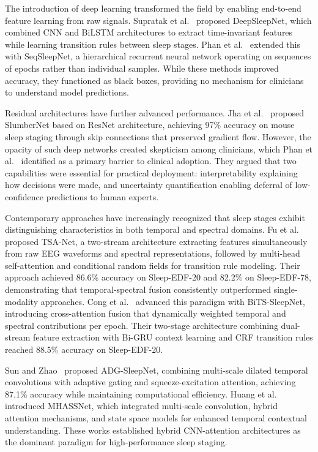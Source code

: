 \documentclass{ieeetj}
\begin{document}
The introduction of deep learning transformed the field by enabling end-to-end feature learning from raw signals. Supratak et al.~\cite{supratak2017deepsleepnet} proposed DeepSleepNet, which combined CNN and BiLSTM architectures to extract time-invariant features while learning transition rules between sleep stages. Phan et al.~\cite{phan2018deepsleepnet} extended this with SeqSleepNet, a hierarchical recurrent neural network operating on sequences of epochs rather than individual samples. While these methods improved accuracy, they functioned as black boxes, providing no mechanism for clinicians to understand model predictions.

Residual architectures have further advanced performance. Jha et al.~\cite{jha2024slumbernet} proposed SlumberNet based on ResNet architecture, achieving 97\% accuracy on mouse sleep staging through skip connections that preserved gradient flow. However, the opacity of such deep networks created skepticism among clinicians, which Phan et al.~\cite{phan2022sleeptransformer} identified as a primary barrier to clinical adoption. They argued that two capabilities were essential for practical deployment: interpretability explaining how decisions were made, and uncertainty quantification enabling deferral of low-confidence predictions to human experts.

Contemporary approaches have increasingly recognized that sleep stages exhibit distinguishing characteristics in both temporal and spectral domains. Fu et al.~\cite{fu2023tsanet} proposed TSA-Net, a two-stream architecture extracting features simultaneously from raw EEG waveforms and spectral representations, followed by multi-head self-attention and conditional random fields for transition rule modeling. Their approach achieved 86.6\% accuracy on Sleep-EDF-20 and 82.2\% on Sleep-EDF-78, demonstrating that temporal-spectral fusion consistently outperformed single-modality approaches. Cong et al.~\cite{cong2025bits} advanced this paradigm with BiTS-SleepNet, introducing cross-attention fusion that dynamically weighted temporal and spectral contributions per epoch. Their two-stage architecture combining dual-stream feature extraction with Bi-GRU context learning and CRF transition rules reached 88.5\% accuracy on Sleep-EDF-20.

Sun and Zhao~\cite{sun2025adg} proposed ADG-SleepNet, combining multi-scale dilated temporal convolutions with adaptive gating and squeeze-excitation attention, achieving 87.1\% accuracy while maintaining computational efficiency. Huang et al.~\cite{huang2025mhas} introduced MHASSNet, which integrated multi-scale convolution, hybrid attention mechanisms, and state space models for enhanced temporal contextual understanding. These works established hybrid CNN-attention architectures as the dominant paradigm for high-performance sleep staging.
\end{document}

